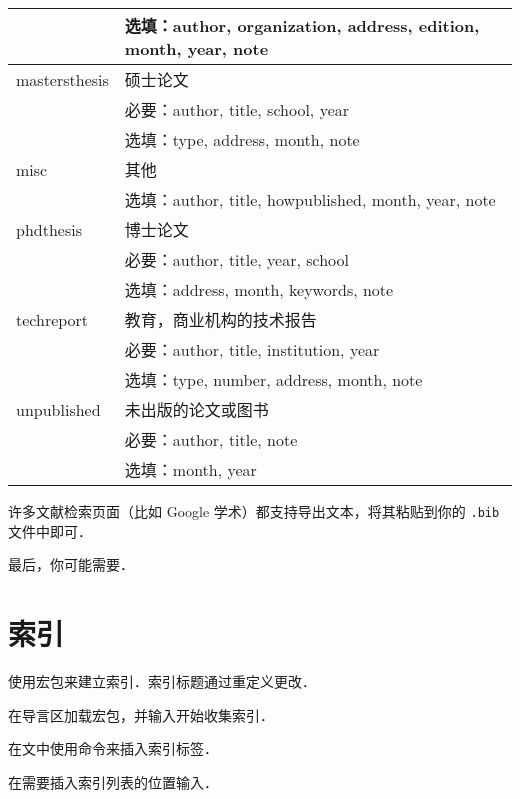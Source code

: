 \begin{table}[!htb]
\begin{tabular}{>{\ttfamily}ll}
& 选填：author, organization, address, edition, month, year, note \\
\hline
mastersthesis & 硕士论文\\
& 必要：author, title, school, year \\
& 选填：type, address, month, note\\
\hline
misc & 其他 \\
& 选填：author, title, howpublished, month, year, note \\
\hline
phdthesis & 博士论文 \\
& 必要：author, title, year, school\\
& 选填：address, month, keywords, note\\
\hline
techreport & 教育，商业机构的技术报告\\
& 必要：author, title, institution, year\\
& 选填：type, number, address, month, note\\
\hline
unpublished & 未出版的论文或图书\\
& 必要：author, title, note\\
& 选填：month, year\\
\hline
\end{tabular}
\end{table}

许多文献检索页面（比如 Google 学术）都支持导出\bibtex 文本，将其粘贴到你的 \texttt{.bib} 文件中即可．

最后，你可能需要．

\section{索引}
使用宏包来建立索引．索引标题通过重定义更改．
\begin{feae}
\item 在导言区加载宏包，并输入开始收集索引．
\item 在文中使用命令来插入索引标签．
\item 在需要插入索引列表的位置输入．
\end{feae}

